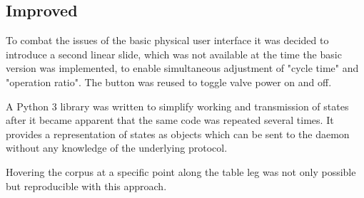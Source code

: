 \subsection{Improved}
To combat the issues of the basic physical user interface it was decided to introduce a second linear slide, which was not available at the time the basic version was implemented, to enable simultaneous adjustment of "cycle time" and "operation ratio". The button was reused to toggle valve power on and off.

A Python 3 library was written to simplify working and transmission of states after it became apparent that the same code was repeated several times. It provides a representation of states as objects which can be sent to the daemon without any knowledge of the underlying protocol. 

Hovering the corpus at a specific point along the table leg was not only possible but reproducible with this approach.  